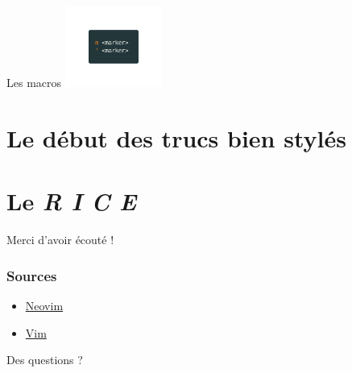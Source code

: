 \documentclass[10pt]{beamer}
\begin{document}
			\begin{frame}{Les macros}
				\center
				\includegraphics[height=100]{img/markers.png}
			\end{frame}

		\section{Le début des trucs bien stylés}
		\section{Le \textit{R I C E}}

	\begin{appendix}

		\begin{frame}[standout]
			Merci d'avoir écouté !
		\end{frame}

		\begin{frame}
			\frametitle{Sources}
			\begin{itemize}
				\item \href{https://neovim.io/}{Neovim}
				\item \href{https://www.vim.org}{Vim}
			\end{itemize}
		\end{frame}

		\begin{frame}[standout]
			Des questions ?
		\end{frame}

	\end{appendix}
\end{document}
